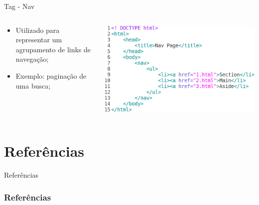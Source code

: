 \documentclass{beamer}
\begin{document}
\begin{frame}{Tag - Nav}
  \begin{columns}
    \begin{column}{0.35 \textwidth}
      \footnotesize
      \begin{itemize}
	\item Utilizado para representar um agrupamento de links de
navegação;
	 \item Exemplo: paginação de uma busca;
      \end{itemize}
    \end{column}
    \begin{column}{0.65\textwidth}
     \includegraphics[height=0.43\paperheight]{fig/aula1/html17.png}
    \end{column}
  \end{columns}
\end{frame}
\section{Referências}
\begin{frame}{Referências}%
\frametitle{Referências}
\small
\begin{center}
\tiny


\end{center}
\end{frame}
\end{document}
